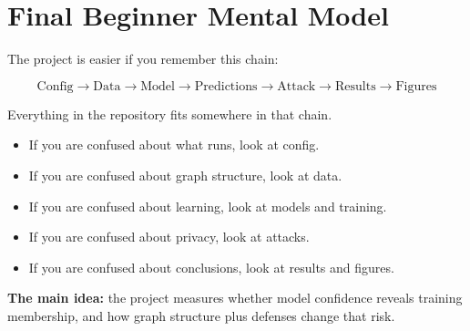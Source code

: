 \documentclass[11pt,a4paper]{article}
\begin{document}
\section{Final Beginner Mental Model}

The project is easier if you remember this chain:

\[
\text{Config} \rightarrow \text{Data} \rightarrow \text{Model} \rightarrow \text{Predictions} \rightarrow \text{Attack} \rightarrow \text{Results} \rightarrow \text{Figures}
\]

Everything in the repository fits somewhere in that chain.

\begin{itemize}
  \item If you are confused about what runs, look at config.
  \item If you are confused about graph structure, look at data.
  \item If you are confused about learning, look at models and training.
  \item If you are confused about privacy, look at attacks.
  \item If you are confused about conclusions, look at results and figures.
\end{itemize}

\textbf{The main idea:} the project measures whether model confidence reveals training membership, and how graph structure plus defenses change that risk.
\end{document}
